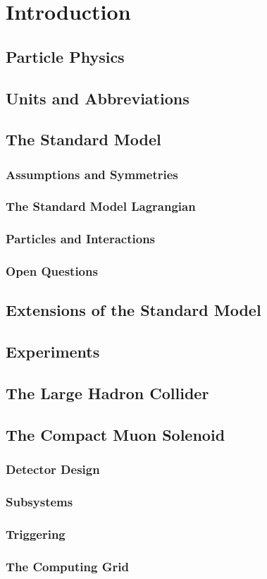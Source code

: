 
\chapter{Introduction}

\section{Particle Physics}


\section{Units and Abbreviations}


\section{The Standard Model}
\subsection{Assumptions and Symmetries}
\subsection{The Standard Model Lagrangian}
\subsection{Particles and Interactions}
\subsection{Open Questions}

\section{Extensions of the Standard Model}

\section{Experiments}

\section{The Large Hadron Collider}

\section{The Compact Muon Solenoid}
\subsection{Detector Design}
\subsection{Subsystems}
\subsection{Triggering}
\subsection{The Computing Grid}